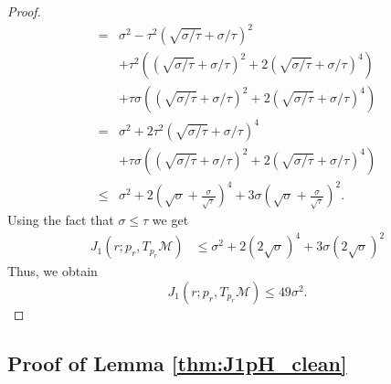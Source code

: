 \documentclass[12pt]{article}
\theoremstyle{remark}
\newcommand{\MM}{\mathcal{M}}
\begin{document}
\begin{appendices}
\begin{proof}
\begin{align*}
		= &
		\sigma^2 -  \tau^2(\sqrt{\sigma/\tau}+\sigma/\tau)^2 \\
		& + \tau^2  ((\sqrt{\sigma/\tau}+\sigma/\tau)^2  +2(\sqrt{\sigma/\tau}+\sigma/\tau)^4) \\& + \tau\sigma  ((\sqrt{\sigma/\tau}+\sigma/\tau)^2+2(\sqrt{\sigma/\tau}+\sigma/\tau)^4) \\
		= &
		\sigma^2 + 2\tau^2 (\sqrt{\sigma/\tau}+\sigma/\tau)^4\\& + \tau\sigma ( (\sqrt{\sigma/\tau}+\sigma/\tau)^2 +2(\sqrt{\sigma/\tau}+\sigma/\tau)^4)\\
		\leq &
		\sigma^2 + 2 \left(\sqrt{\sigma} + \frac{\sigma}{\sqrt{\tau}}\right)^4
		+ 3\sigma
		\left(\sqrt{\sigma} + \frac{\sigma}{\sqrt{\tau}}\right)^2 %
	.\end{align*}
Using the fact that $ \sigma \leq \tau $ we get
\begin{align*}
J_1(r; {p_r}, T_{{p_r}}\MM) &\leq
\sigma^2 + 2(2\sqrt{\sigma})^4 + 3\sigma (2\sqrt{\sigma})^2
\end{align*}
Thus, we obtain
$$J_1(r; {p_r}, T_{{p_r}}\MM) \leq 49 \sigma^2.$$
\end{proof}

\subsection{Proof of Lemma \ref{thm:J1pH_clean}}\label{sec:proof_thmJ1pH_clean}



\end{appendices}
\end{document}
